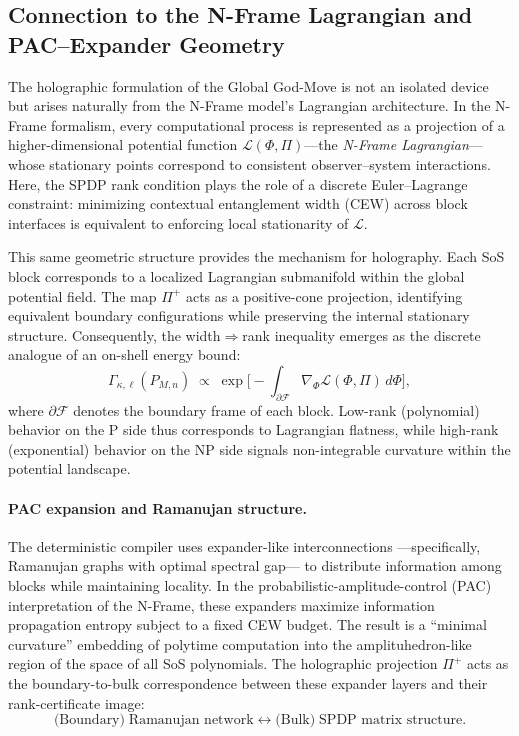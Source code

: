 \documentclass[12pt]{article}
\theoremstyle{definition}
\theoremstyle{definition}
\theoremstyle{remark}
\theoremstyle{remark}
\begin{document}
\subsection{Connection to the N-Frame Lagrangian and PAC--Expander Geometry}
\label{sec:nframe-connection}

The holographic formulation of the Global God-Move is not an isolated device but
arises naturally from the N-Frame model's Lagrangian architecture.
In the N-Frame formalism, every computational process is represented as a
projection of a higher-dimensional potential function
$\mathcal{L}(\Phi,\Pi)$---the \emph{N-Frame Lagrangian}---whose stationary
points correspond to consistent observer--system interactions.
Here, the SPDP rank condition plays the role of a discrete Euler--Lagrange
constraint: minimizing contextual entanglement width (CEW) across block
interfaces is equivalent to enforcing local stationarity of $\mathcal{L}$.

This same geometric structure provides the mechanism for holography.
Each SoS block corresponds to a localized Lagrangian submanifold within the
global potential field.  The map $\Pi^+$ acts as a positive-cone projection,
identifying equivalent boundary configurations while preserving the internal
stationary structure.  Consequently, the width$\Rightarrow$rank inequality
emerges as the discrete analogue of an on-shell energy bound:
\[
  \Gamma_{\kappa,\ell}(P_{M,n})
  \;\propto\;
  \exp\!\Big[-\!\!\int_{\partial \mathcal{F}}
  \nabla_{\Phi} \mathcal{L}(\Phi,\Pi)\,d\Phi\Big],
\]
where $\partial \mathcal{F}$ denotes the boundary frame of each block.
Low-rank (polynomial) behavior on the P side thus corresponds to Lagrangian
flatness, while high-rank (exponential) behavior on the NP side signals
non-integrable curvature within the potential landscape.

\paragraph{PAC expansion and Ramanujan structure.}
The deterministic compiler uses expander-like interconnections
---specifically, Ramanujan graphs with optimal spectral gap---
to distribute information among blocks while maintaining locality.
In the probabilistic-amplitude-control (PAC) interpretation of the N-Frame,
these expanders maximize information propagation entropy subject to
a fixed CEW budget.  The result is a ``minimal curvature'' embedding of
polytime computation into the amplituhedron-like region of the space of
all SoS polynomials.  The holographic projection $\Pi^+$ acts as the
boundary-to-bulk correspondence between these expander layers and their
rank-certificate image:
\[
  \text{(Boundary)}\; \text{Ramanujan network}
  \;\longleftrightarrow\;
  \text{(Bulk)}\; \text{SPDP matrix structure.}
\]
\end{document}
